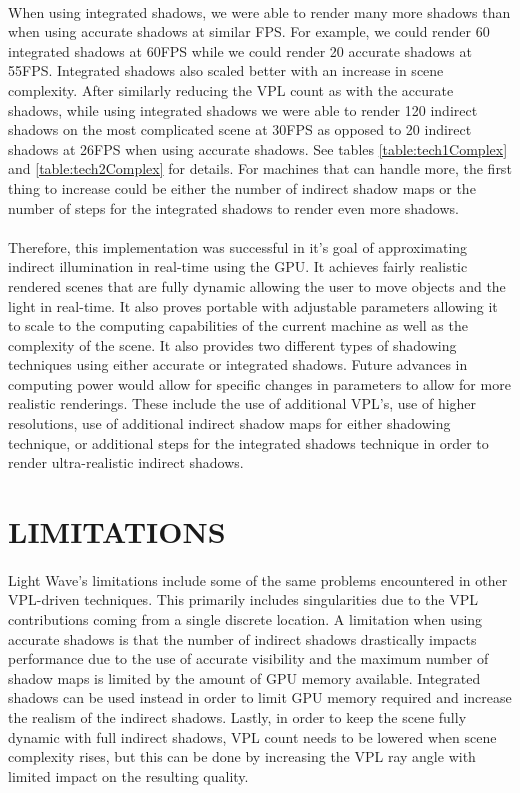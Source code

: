 \paragraph{}
When using integrated shadows, we were able to render many more shadows than when using accurate shadows at similar FPS.  For example, we could render 60 integrated shadows at 60FPS while we could render 20 accurate shadows at 55FPS.  Integrated shadows also scaled better with an increase in scene complexity.  After similarly reducing the VPL count as with the accurate shadows, while using integrated shadows we were able to render 120 indirect shadows on the most complicated scene at 30FPS as opposed to 20 indirect shadows at 26FPS when using accurate shadows.  See tables \ref{table:tech1Complex} and \ref{table:tech2Complex} for details.  For machines that can handle more, the first thing to increase could be either the number of indirect shadow maps or the number of steps for the integrated shadows to render even more shadows.

\paragraph{}
Therefore, this implementation was successful in it's goal of approximating indirect illumination in real-time using the GPU.  It achieves fairly realistic rendered scenes that are fully dynamic allowing the user to move objects and the light in real-time.  It also proves portable with adjustable parameters allowing it to scale to the computing capabilities of the current machine as well as the complexity of the scene.  It also provides two different types of shadowing techniques using either accurate or integrated shadows.  Future advances in computing power would allow for specific changes in parameters to allow for more realistic renderings.  These include the use of additional VPL's, use of higher resolutions, use of additional indirect shadow maps for either shadowing technique, or additional steps for the integrated shadows technique in order to render ultra-realistic indirect shadows.

\section{LIMITATIONS}
\paragraph{}
Light Wave's limitations include some of the same problems encountered in other VPL-driven techniques.  This primarily includes singularities due to the VPL contributions coming from a single discrete location.  A limitation when using accurate shadows is that the number of indirect shadows drastically impacts performance due to the use of accurate visibility and the maximum number of shadow maps is limited by the amount of GPU memory available.  Integrated shadows can be used instead in order to limit GPU memory required and increase the realism of the indirect shadows.  Lastly, in order to keep the scene fully dynamic with full indirect shadows, VPL count needs to be lowered when scene complexity rises, but this can be done by increasing the VPL ray angle with limited impact on the resulting quality.

